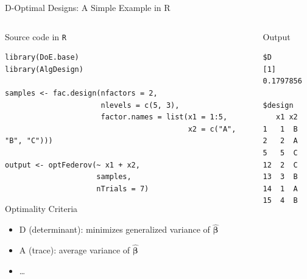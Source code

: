 \documentclass[10pt, compress, aspectratio=169, xcolor={table,usenames,dvipsnames}]{beamer}
\begin{document}
\begin{frame}[label={sec:orgd99a151},fragile]{D-Optimal Designs: A Simple Example in R}
 \begin{columns}
\begin{column}{0.7\columnwidth}
\begin{block}{Source code in \texttt{R}}
\vspace{-.2cm}

\lstset{language=r,label= ,caption= ,captionpos=b,numbers=none}
\begin{lstlisting}
library(DoE.base)
library(AlgDesign)

samples <- fac.design(nfactors = 2,
                      nlevels = c(5, 3),
                      factor.names = list(x1 = 1:5,
                                          x2 = c("A", "B", "C")))

output <- optFederov(~ x1 + x2,
                     samples,
                     nTrials = 7)
\end{lstlisting}

\begin{block}{Optimality Criteria}
\begin{itemize}
\item \alert{D} (determinant): minimizes generalized variance of \(\bm{\hat{\beta}}\)
\item \alert{A} (trace): average variance of \(\bm{\hat{\beta}}\)
\item \dots{}
\end{itemize}
\end{block}
\end{block}
\end{column}


\begin{column}{0.3\columnwidth}
\begin{block}{Output}
\vspace{-.2cm}
\scriptsize

\begin{verbatim}
$D
[1] 0.1797856

$design
   x1 x2
1   1  B
2   2  A
5   5  C
12  2  C
13  3  B
14  1  A
15  4  B
\end{verbatim}


\normalsize
\end{block}
\end{column}
\end{columns}
\end{frame}
\end{document}
